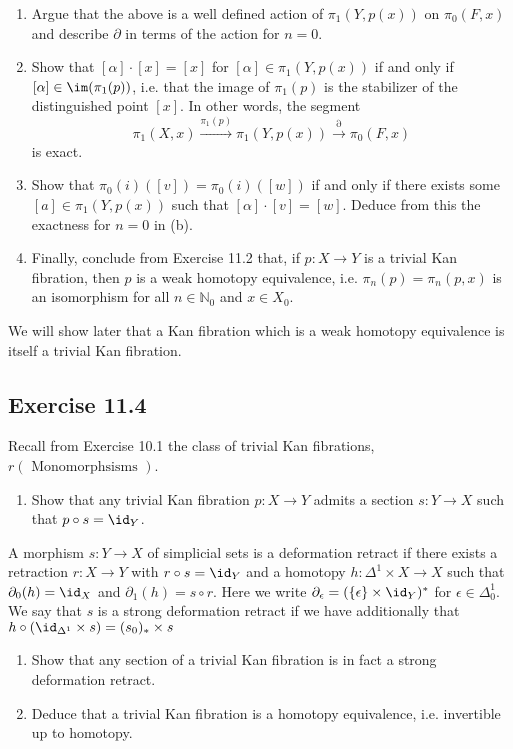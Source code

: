 \begin{enumerate}[label=(\alph*), resume]
    \item 
    Argue that the above is a well defined action of $ \pi_1 ( Y , p ( x ) ) $ on $ \pi_0 ( F ,x ) $ and describe $ \partial $ in terms of the action for $ n = 0 $.

    \item 
    Show that $ [ \alpha ] \cdot [ x ] = [ x ] $ for $ [ \alpha ] \in \pi_1( Y , p ( x ) ) $ if and only if $ [ \alpha ] \in \im ( \pi_1 ( p ) )$, i.e. that the image of $ \pi_1(p) $ is the stabilizer of the distinguished point $ [ x ] $. In other words, the segment 
    \[
        \pi_1( X , x ) 
        \xrightarrow{\pi_1 ( p )}
        \pi_1 ( Y , p ( x ) ) 
        \xrightarrow{ \partial }
        \pi_0 ( F , x ) 
    \]
    is exact.

    \item 
    Show that $ \pi_0 ( i ) ( [v] ) = \pi_0 ( i ) ( [ w ] ) $ if and only if there exists some $ [ a ] \in \pi_1 ( Y , p ( x ) ) $ such that $ [ \alpha ] \cdot [ v ] = [ w ] $. 
    Deduce from this the exactness for $ n = 0 $ in (b).

    \item 
    Finally, conclude from Exercise 11.2 that, if $ p : X \to Y $ is a trivial Kan fibration, then $ p $ is a weak homotopy equivalence, i.e. $ \pi_n ( p ) = \pi_n ( p ,x )$ is an isomorphism for all $ n \in \mathbb{N}_0 $ and $ x \in X_0 $.
\end{enumerate}

We will show later that a Kan fibration which is a weak homotopy equivalence is itself a trivial Kan fibration.

\subsection{Exercise 11.4}

Recall from Exercise 10.1 the class of trivial Kan fibrations, $ r ( \text{ Monomorphsisms } ) $.

\begin{enumerate}[label=(\alph*)]
    \item 
    Show that any trivial Kan fibration $ p \colon X \to Y $ admits a section $ s \colon Y \to X $ such that $ p \circ s = \id_Y $.
    
\end{enumerate}

A morphism $ s \colon Y \to X $ of simplicial sets is a deformation retract if there exists a retraction $ r \colon X \to Y $ with $ r \circ s = \id_Y $ and a homotopy $ h \colon \Delta^1 \times X \to X $ such that $ \partial_0 ( h ) = \id_X $ and $ \partial_1 ( h ) = s \circ r $.
Here we write $ \partial_{ \epsilon} = ( \{ \epsilon \} \times \id_Y )^*$ for $ \epsilon \in \Delta^1_0 $.
We say that $ s $ is a strong deformation retract if we have additionally that $ h \circ  ( \id_{ \Delta^1 } \times s ) = ( s_0)_* \times s $

\begin{enumerate}[label=(\alph*), resume]
    \item 
    Show that any section of a trivial Kan fibration is in fact a strong deformation retract.

    \item 
    Deduce that a trivial Kan fibration is a homotopy equivalence, i.e. invertible up to homotopy.
\end{enumerate}

